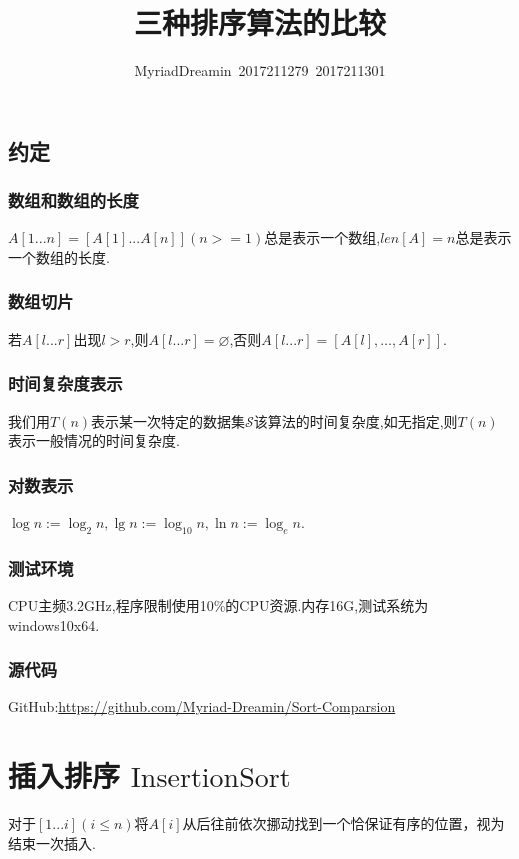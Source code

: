 \documentclass[UTF8]{ctexart}
\title{三种排序算法的比较}
\author{MyriadDreamin\ 2017211279\ 2017211301}
\date{}
\begin{document}
\setlength{\parindent}{2em}
\setlength{\baselineskip}{2.5em}
\maketitle
\tableofcontents
\newpage
\subsection{约定}
\subsubsection{数组和数组的长度}
$A[1...n]=[A[1]...A[n]](n>=1)$总是表示一个数组,$len[A]=n$总是表示一个数组的长度.
\subsubsection{数组切片}
若$A[l...r]$出现$l>r$,则$A[l...r]=\varnothing$,否则$A[l...r]=[A[l],\dots,A[r]]$.
\subsubsection{时间复杂度表示}
我们用$T(n)$表示某一次特定的数据集$\mathcal{S}$该算法的时间复杂度,如无指定,则$T(n)$表示一般情况的时间复杂度.
\subsubsection{对数表示}
$\log n:=\log_2 n,\lg n := \log_{10} n, \ln n := \log_{e}n$.
\subsubsection{测试环境}
CPU主频3.2GHz,程序限制使用10\%的CPU资源.内存16G,测试系统为windows10x64.
\subsubsection{源代码}
GitHub:\url{https://github.com/Myriad-Dreamin/Sort-Comparsion}
\newpage

\section{插入排序 $\mathrm{InsertionSort}$}
对于$[1...i](i\leqslant n)$将$A[i]$从后往前依次挪动找到一个恰保证有序的位置，视为结束一次插入.
\end{document}
